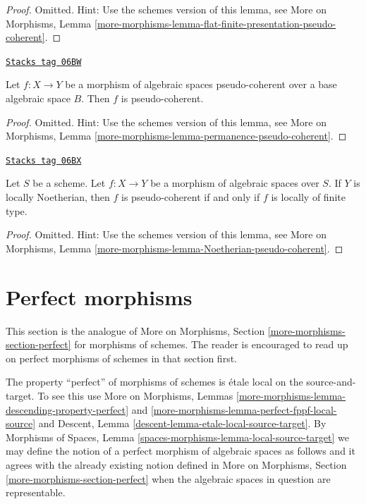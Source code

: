 \begin{proof}
Omitted. Hint: Use the schemes version of this lemma, see
More on Morphisms,
Lemma \ref{more-morphisms-lemma-flat-finite-presentation-pseudo-coherent}.
\end{proof}

\begin{lemma}
\label{spaces-more-morphisms-lemma-permanence-pseudo-coherent}
\href{https://stacks.math.columbia.edu/tag/06BW}{\texttt{Stacks tag 06BW}}

Let $f : X \to Y$ be a morphism of algebraic spaces pseudo-coherent
over a base algebraic space $B$. Then $f$ is pseudo-coherent.
\end{lemma}

\begin{proof}
Omitted. Hint: Use the schemes version of this lemma, see
More on Morphisms,
Lemma \ref{more-morphisms-lemma-permanence-pseudo-coherent}.
\end{proof}

\begin{lemma}
\label{spaces-more-morphisms-lemma-Noetherian-pseudo-coherent}
\href{https://stacks.math.columbia.edu/tag/06BX}{\texttt{Stacks tag 06BX}}

Let $S$ be a scheme. Let $f : X \to Y$ be a morphism of algebraic spaces
over $S$. If $Y$ is locally Noetherian, then $f$ is pseudo-coherent if
and only if $f$ is locally of finite type.
\end{lemma}

\begin{proof}
Omitted. Hint: Use the schemes version of this lemma, see
More on Morphisms,
Lemma \ref{more-morphisms-lemma-Noetherian-pseudo-coherent}.
\end{proof}

\section{Perfect morphisms}
\label{spaces-more-morphisms-section-perfect}
This section is the analogue of
More on Morphisms, Section \ref{more-morphisms-section-perfect}
for morphisms of schemes. The reader is encouraged to read up
on perfect morphisms of schemes in that section first.

\medskip\noindent
The property ``perfect'' of morphisms of schemes is
\'etale local on the source-and-target. To see this use
More on Morphisms,
Lemmas \ref{more-morphisms-lemma-descending-property-perfect} and
\ref{more-morphisms-lemma-perfect-fppf-local-source}
and
Descent, Lemma \ref{descent-lemma-etale-local-source-target}.
By
Morphisms of Spaces,
Lemma \ref{spaces-morphisms-lemma-local-source-target}
we may define the notion of a perfect morphism of algebraic spaces as
follows and it agrees with the already existing notion defined in
More on Morphisms, Section \ref{more-morphisms-section-perfect}
when the algebraic spaces in question are representable.

